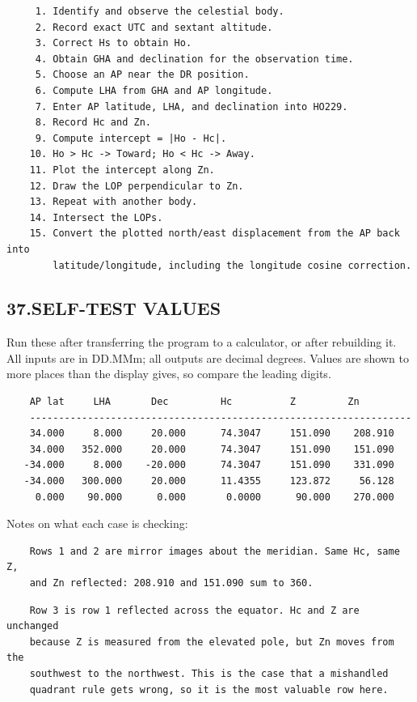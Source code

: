 \documentclass[11pt]{article}
\begin{document}
\begin{verbatim}
     1. Identify and observe the celestial body.
     2. Record exact UTC and sextant altitude.
     3. Correct Hs to obtain Ho.
     4. Obtain GHA and declination for the observation time.
     5. Choose an AP near the DR position.
     6. Compute LHA from GHA and AP longitude.
     7. Enter AP latitude, LHA, and declination into HO229.
     8. Record Hc and Zn.
     9. Compute intercept = |Ho - Hc|.
    10. Ho > Hc -> Toward; Ho < Hc -> Away.
    11. Plot the intercept along Zn.
    12. Draw the LOP perpendicular to Zn.
    13. Repeat with another body.
    14. Intersect the LOPs.
    15. Convert the plotted north/east displacement from the AP back into
        latitude/longitude, including the longitude cosine correction.
\end{verbatim}

\subsection*{37.\quad SELF-TEST VALUES}

Run these after transferring the program to a calculator, or after rebuilding it. All inputs are in DD.MMm; all outputs are decimal degrees. Values are shown to more places than the display gives, so compare the leading digits.

\begin{verbatim}
    AP lat     LHA       Dec         Hc          Z         Zn
    ------------------------------------------------------------------
    34.000     8.000     20.000      74.3047     151.090    208.910
    34.000   352.000     20.000      74.3047     151.090    151.090
   -34.000     8.000    -20.000      74.3047     151.090    331.090
   -34.000   300.000     20.000      11.4355     123.872     56.128
     0.000    90.000      0.000       0.0000      90.000    270.000
\end{verbatim}

Notes on what each case is checking:

\begin{verbatim}
    Rows 1 and 2 are mirror images about the meridian. Same Hc, same Z,
    and Zn reflected: 208.910 and 151.090 sum to 360.
\end{verbatim}

\begin{verbatim}
    Row 3 is row 1 reflected across the equator. Hc and Z are unchanged
    because Z is measured from the elevated pole, but Zn moves from the
    southwest to the northwest. This is the case that a mishandled
    quadrant rule gets wrong, so it is the most valuable row here.
\end{verbatim}
\end{document}
